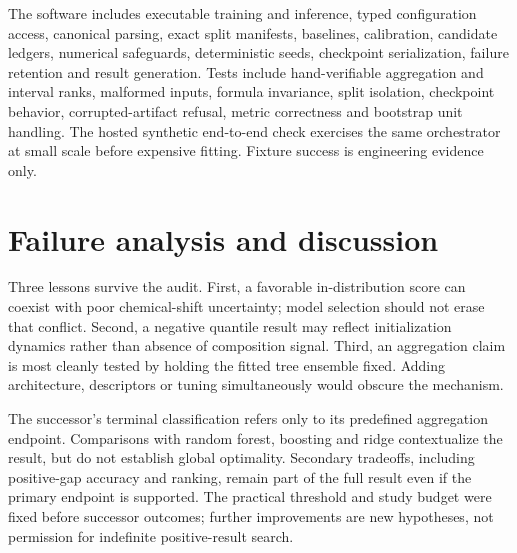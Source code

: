 \documentclass[11pt]{article}
\begin{document}
The software includes executable training and inference, typed configuration access, canonical parsing, exact split manifests, baselines, calibration, candidate ledgers, numerical safeguards, deterministic seeds, checkpoint serialization, failure retention and result generation. Tests include hand-verifiable aggregation and interval ranks, malformed inputs, formula invariance, split isolation, checkpoint behavior, corrupted-artifact refusal, metric correctness and bootstrap unit handling. The hosted synthetic end-to-end check exercises the same orchestrator at small scale before expensive fitting. Fixture success is engineering evidence only.

\section{Failure analysis and discussion}
Three lessons survive the audit. First, a favorable in-distribution score can coexist with poor chemical-shift uncertainty; model selection should not erase that conflict. Second, a negative quantile result may reflect initialization dynamics rather than absence of composition signal. Third, an aggregation claim is most cleanly tested by holding the fitted tree ensemble fixed. Adding architecture, descriptors or tuning simultaneously would obscure the mechanism.

The successor's terminal classification refers only to its predefined aggregation endpoint. Comparisons with random forest, boosting and ridge contextualize the result, but do not establish global optimality. Secondary tradeoffs, including positive-gap accuracy and ranking, remain part of the full result even if the primary endpoint is supported. The practical threshold and study budget were fixed before successor outcomes; further improvements are new hypotheses, not permission for indefinite positive-result search.
\end{document}
